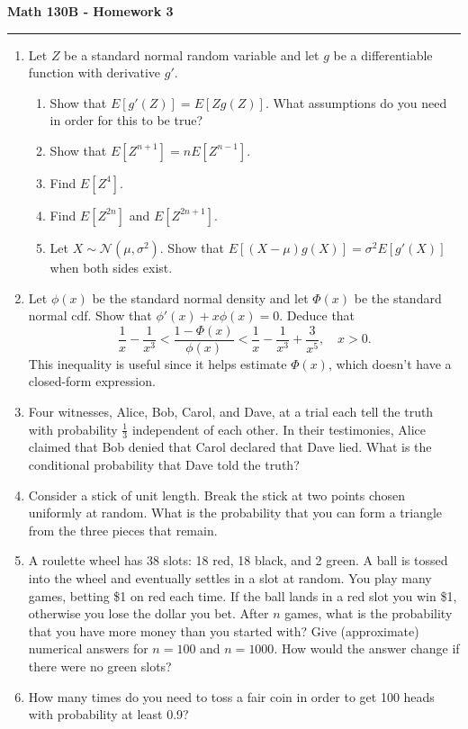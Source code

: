 \documentclass[11pt,letterpaper]{report}
\newcommand{\mcal}[1]{\mathcal{#1}}
\begin{document}
\begin{center}
{\bf \Large Math 130B - Homework 3}
\vspace{0.2cm}
\hrule
\end{center}


\begin{enumerate}
	\item Let $Z$ be a standard normal random variable and let $g$ be a differentiable function with derivative $g'$.
	\begin{enumerate}
		\item Show that $E[g'(Z)] = E[Zg(Z)]$. What assumptions do you need in order for this to be true?
		\item Show that $E[Z^{n+1}] = nE[Z^{n-1}]$.
		\item Find $E[Z^4]$.
		\item Find $E[Z^{2n}]$ and $E[Z^{2n+1}]$.
		\item Let $X\sim \mcal{N}(\mu, \sigma^2)$. Show that $E[(X-\mu)g(X)] = \sigma^2E[g'(X)]$ when both sides exist.
	\end{enumerate}

	\item Let $\phi(x)$ be the standard normal density and let $\Phi(x)$ be the standard normal cdf. Show that $\phi'(x) + x\phi(x) = 0$. Deduce that
	\[
	\frac{1}{x} - \frac{1}{x^3} < \frac{1-\Phi(x)}{\phi(x)} < \frac{1}{x} - \frac{1}{x^3} + \frac{3}{x^5},\quad x>0.
	\]
	This inequality is useful since it helps estimate $\Phi(x)$, which doesn't have a closed-form expression.

	\item Four witnesses, Alice, Bob, Carol, and Dave, at a trial each tell the truth with probability $\frac{1}{3}$ independent of each other. In their testimonies, Alice claimed that Bob denied that Carol declared that Dave lied. What is the conditional probability that Dave told the truth?

	\item Consider a stick of unit length. Break the stick at two points chosen uniformly at random. What is the probability that you can form a triangle from the three pieces that remain.

	\item A roulette wheel has 38 slots: 18 red, 18 black, and 2 green. A ball is tossed into the wheel and eventually settles in a slot at random. You play many games, betting \$1 on red each time. If the ball lands in a red slot you win \$1, otherwise you lose the dollar you bet. After $n$ games, what is the probability that you have more money than you started with? Give (approximate) numerical answers for $n=100$ and $n=1000$. How would the answer change if there were no green slots?

	\item How many times do you need to toss a fair coin in order to get 100 heads with probability at least 0.9?

\end{enumerate}
\end{document}
